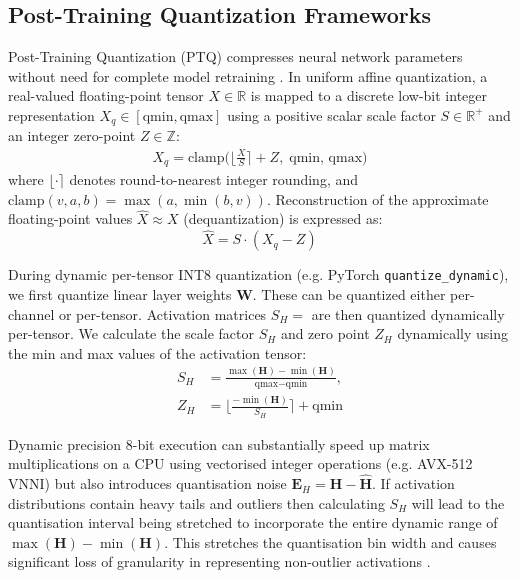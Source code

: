 \documentclass[10pt,journal,compsoc]{IEEEtran}
\begin{document}
\subsection{Post-Training Quantization Frameworks}
Post-Training Quantization (PTQ) compresses neural network parameters without need for complete model retraining \cite{nagel2021white}. In uniform affine quantization, a real-valued floating-point tensor $X \in \mathbb{R}$ is mapped to a discrete low-bit integer representation $X_q \in [\text{qmin}, \text{qmax}]$ using a positive scalar scale factor $S \in \mathbb{R}^+$ and an integer zero-point $Z \in \mathbb{Z}$:
\begin{equation}
\begin{split}
    X_q = \text{clamp}\Big( \Big\lfloor \frac{X}{S} \Big\rceil + Z, \; \text{qmin}, \, \text{qmax} \Big)
\end{split}
    \label{eq:quant_affine}
\end{equation}
where $\lfloor \cdot \rceil$ denotes round-to-nearest integer rounding, and $\text{clamp}(v, a, b) = \max(a, \min(b, v))$. Reconstruction of the approximate floating-point values $\hat{X} \approx X$ (dequantization) is expressed as:
\begin{equation}
    \hat{X} = S \cdot (X_q - Z)
    \label{eq:dequant}
\end{equation}

During dynamic per-tensor INT8 quantization (e.g. PyTorch \texttt{quantize\_dynamic}), we first quantize linear layer weights $\mathbf{W}$. These can be quantized either per-channel or per-tensor. Activation matrices $\displaystyle S_H =$ are then quantized dynamically per-tensor. We calculate the scale factor $S_H$ and zero point $Z_H$ dynamically using the min and max values of the activation tensor:
\begin{equation}
\begin{split}
    S_H &= \frac{\max(\mathbf{H}) - \min(\mathbf{H})}{\text{qmax} - \text{qmin}}, \\
    Z_H &= \Big\lfloor \frac{-\min(\mathbf{H})}{S_H} \Big\rceil + \text{qmin}
\end{split}
    \label{eq:dynamic_scale}
\end{equation}

Dynamic precision 8-bit execution can substantially speed up matrix multiplications on a CPU using vectorised integer operations (e.g. AVX-512 VNNI) but also introduces quantisation noise $\mathbf{E}_H = \mathbf{H} - \hat{\mathbf{H}}$. If activation distributions contain heavy tails and outliers then calculating $S_H$ will lead to the quantisation interval being stretched to incorporate the entire dynamic range of $\max(\mathbf{H}) - \min(\mathbf{H})$. This stretches the quantisation bin width and causes significant loss of granularity in representing non-outlier activations \cite{dettmers2022llmint8, xiao2023smoothquant}.
\end{document}
